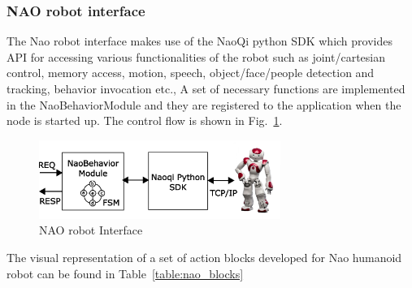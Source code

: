 \subsubsection{NAO robot interface}
\label{sssec:nao_interface}
The Nao robot interface makes use of the NaoQi python SDK which provides API for accessing various functionalities of the robot such as joint/cartesian control, memory access, motion, speech, object/face/people detection and tracking, behavior invocation etc., A set of necessary functions are implemented in the NaoBehaviorModule and they are registered to the application when the node is started up. The control flow is shown in Fig.~\ref{fig:nao_interface}.
\begin{figure}[H]
\centering
\includegraphics[width=0.7\textwidth]{assets/NaoBehaviorModule.eps}
\caption[NAO robot Interface]{NAO robot Interface}
\label{fig:nao_interface}
\end{figure}
The visual representation of a set of action blocks developed for Nao humanoid robot can be found in Table~\ref{table:nao_blocks}
